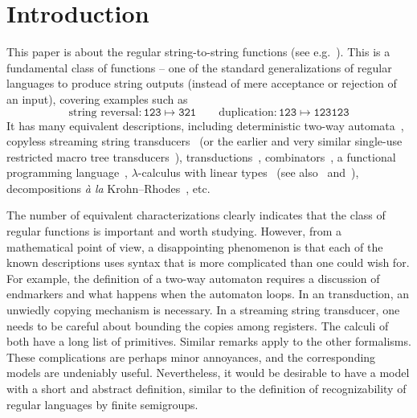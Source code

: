 \section{Introduction}
\label{sec:intro}

This paper is about the regular string-to-string functions (see e.g.~\cite{MuschollPuppis}). This is a
fundamental class of functions -- one of the standard generalizations of regular languages to produce string
outputs (instead of mere acceptance or rejection of an input), covering examples such as
\[ \text{string reversal}\colon \mathtt{123 \mapsto 321} \qquad \text{duplication}\colon \mathtt{123 \mapsto 123123}\]
It has many equivalent descriptions, including deterministic two-way automata~\cite[Note~4]{shepherdson1959reduction}, copyless streaming string transducers~\cite[Section~3]{alurExpressivenessStreamingString2010} (or the earlier and very similar single-use restricted macro tree transducers~\cite[Section~5]{MacroMSO}), \mso transductions~\cite[Theorem~13]{engelfrietMSODefinableString2001}, combinators~\cite[Section~2]{alur2014regular}, a functional programming language~\cite[Section~6]{bojanczykRegularFirstOrderList2018}, $\lambda$-calculus with linear types~\cite[Theorem~3]{LambdaTransducer} (see also~\cite[Claim~6.2]{IATLC} and~\cite[Theorem~1.2.3]{titoPhD}), decompositions \textit{à la} Krohn--Rhodes~\cite[Theorem~18, item~4]{bojanczykstefanski2020}, etc.

The number of equivalent characterizations clearly indicates that
the class of regular functions is important and worth studying. However, from a mathematical point of view, a disappointing phenomenon is that each of the known descriptions uses syntax that is more complicated than one could wish for. For example, the definition of a two-way automaton requires a discussion of endmarkers and what happens when the automaton loops. In an \mso transduction, an unwiedly copying mechanism is necessary. In a streaming string transducer, one needs to be careful about bounding the copies among registers.
The calculi of~\cite{alur2014regular,bojanczykRegularFirstOrderList2018} both have a long list of primitives.
Similar remarks apply to the other formalisms. These complications are perhaps minor annoyances, and the corresponding models are undeniably useful. Nevertheless, it would be desirable to have a model with a short and abstract definition, similar to the definition of recognizability of regular languages by finite semigroups. %

